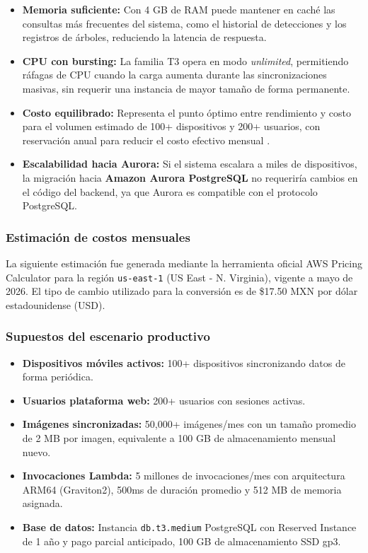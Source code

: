 \begin{itemize}
    \item \textbf{Memoria suficiente:} Con 4 GB de RAM puede mantener
    en caché las consultas más frecuentes del sistema, como el historial
    de detecciones y los registros de árboles, reduciendo la latencia
    de respuesta.
    \item \textbf{CPU con bursting:} La familia T3 opera en modo
    \textit{unlimited}, permitiendo ráfagas de CPU cuando la carga
    aumenta durante las sincronizaciones masivas, sin requerir una
    instancia de mayor tamaño de forma permanente.
    \item \textbf{Costo equilibrado:} Representa el punto óptimo entre
    rendimiento y costo para el volumen estimado de 100+ dispositivos
    y 200+ usuarios, con reservación anual para reducir el costo
    efectivo mensual \cite{aws_rds_pricing}.
    \item \textbf{Escalabilidad hacia Aurora:} Si el sistema escalara
    a miles de dispositivos, la migración hacia \textbf{Amazon Aurora
    PostgreSQL} no requeriría cambios en el código del backend, ya
    que Aurora es compatible con el protocolo PostgreSQL.
\end{itemize}

\subsubsection*{Estimación de costos mensuales}

La siguiente estimación fue generada mediante la herramienta oficial
AWS Pricing Calculator \cite{aws_calculator} para la región
\texttt{us-east-1} (US East - N. Virginia), vigente a mayo de 2026.
El tipo de cambio utilizado para la conversión es de \$17.50 MXN por
dólar estadounidense (USD).

\subsubsection*{Supuestos del escenario productivo}

\begin{itemize}
    \item \textbf{Dispositivos móviles activos:} 100+ dispositivos
    sincronizando datos de forma periódica.
    \item \textbf{Usuarios plataforma web:} 200+ usuarios con sesiones
    activas.
    \item \textbf{Imágenes sincronizadas:} 50,000+ imágenes/mes con
    un tamaño promedio de 2 MB por imagen, equivalente a 100 GB de
    almacenamiento mensual nuevo.
    \item \textbf{Invocaciones Lambda:} 5 millones de invocaciones/mes
    con arquitectura ARM64 (Graviton2), 500ms de duración promedio y
    512 MB de memoria asignada.
    \item \textbf{Base de datos:} Instancia \texttt{db.t3.medium}
    PostgreSQL con Reserved Instance de 1 año y pago parcial anticipado,
    100 GB de almacenamiento SSD gp3.
\end{itemize}

